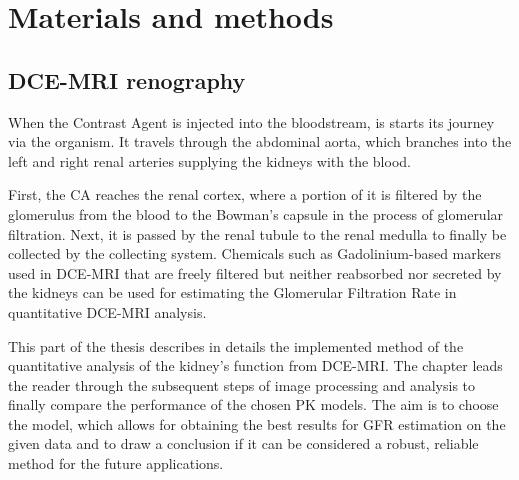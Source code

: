 \chapter{Materials and methods}
\section{DCE-MRI renography}
When the Contrast Agent is injected into the bloodstream, is starts its journey via the organism. It travels  through the abdominal aorta, which branches  into the left and right renal arteries supplying the kidneys with the blood.  

First, the CA reaches the renal cortex, where a portion of it is filtered by the glomerulus from the blood to the Bowman's capsule in the process of glomerular filtration. Next, it is passed by the renal tubule to the renal medulla to finally be collected by the collecting system.   
Chemicals such as Gadolinium-based markers used in DCE-MRI that are freely filtered but neither reabsorbed nor secreted by the kidneys can be used for estimating the Glomerular Filtration Rate in quantitative DCE-MRI analysis.

This part of the thesis describes in details the implemented method of the quantitative analysis of the kidney's function from DCE-MRI. The chapter leads the reader through the subsequent steps of image processing and analysis to finally compare the performance of the chosen PK models. The aim is to choose the model, which allows for obtaining the best results for GFR estimation on the given data and to draw a conclusion if it can be considered a robust, reliable method for the future applications. 

